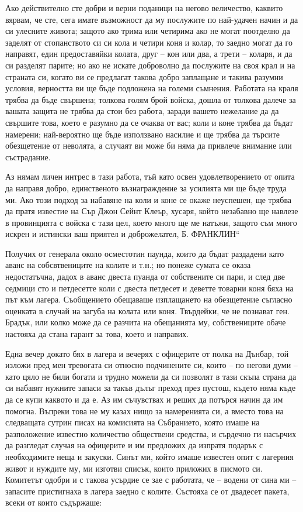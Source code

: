 \documentclass[12pt]{book}
\begin{document}
Ако действително сте добри и верни поданици на негово величество, каквито вярвам, че сте, сега имате възможност да му послужите по най-удачен начин и да си улесните живота; защото ако трима или четирима ако не могат поотделно да заделят от стопанството си си кола и четири коня и колар, то заедно могат да го направят, един предоставяйки колата, друг – кон или два, а трети – коларя, и да си разделят парите; но ако не искате доброволно да послужите на своя крал и на страната си, когато ви се предлагат такова добро заплащане и такива разумни условия, верността ви ще бъде подложена на големи съмнения. Работата на краля трябва да бъде свършена; толкова голям брой войска, дошла от толкова далече за вашата защита не трябва да стои без работа, заради вашето нежелание да да свършите това, което е разумно да се очаква от вас; коли и коне трябва да бъдат намерени; най-вероятно ще бъде използвано насилие и ще трябва да търсите обезщетение от неволята, а случаят ви може би няма да привлече внимание или състрадание. 

Аз нямам личен интрес в тази работа, тъй като освен удовлетворението от опита да направя добро, единственото възнаграждение за усилията ми ще бъде труда ми. Ако този подход за набавяне на коли и коне се окаже неуспешен, ще трябва да пратя известие на Сър Джон Сейнт Клеър, хусаря, който незабавно ще навлезе в провинцията с войска с тази цел, което много ще ме натъжи, защото съм много искрен и истински ваш приятел и доброжелател, Б. ФРАНКЛИН“

Получих от генерала около осместотин паунда, които да бъдат раздадени като аванс на собсвтвениците на колите и т.н.; но понеже сумата се оказа недостатъчна, дадох в аванс двеста пуанда от собствените си пари, и след две седмици сто и петдесетте коли с двеста петдесет и деветте товарни коня бяха на път към лагера. Съобщението обещаваше изплащането на обезщетение съгласно оценката в случай на загуба на колата или коня. Твърдейки, че не познават ген. Брадък, или колко може да се разчита на обещанията му, собствениците обаче настояха да стана гарант за това, което и направих. 

Една вечер докато бях в лагера и вечерях с офицерите от полка на Дънбар, той изложи пред мен тревогата си относно подчинените си, които – по негови думи – като цяло не били богати и трудно можели да си позволят в тази скъпа страна да си набавят нужните запаси за такъв дълъг преход през пустош, където няма къде да се купи каквото и да е. Аз им съчувствах и реших да потърся начин да им помогна. Въпреки това не му казах нищо за намеренията си, а вместо това на следващата сутрин писах на комисията на Събранието, която имаше на разположение известно количество обществени средства, и сърдечно ги насърчих да разгледат случая на офицерите и им предложих да изпратя подарък с необходимите неща и закуски. Синът ми, който имаше известен опит с лагерния живот и нуждите му, ми  изготви списък, които приложих в писмото си. Комитетът одобри и с такова усърдие се зае с работата, че – водени от сина ми – запасите пристигнаха в лагера заедно с колите. Състояха се от двадесет пакета, всеки от които съдържаше:
\end{document}
